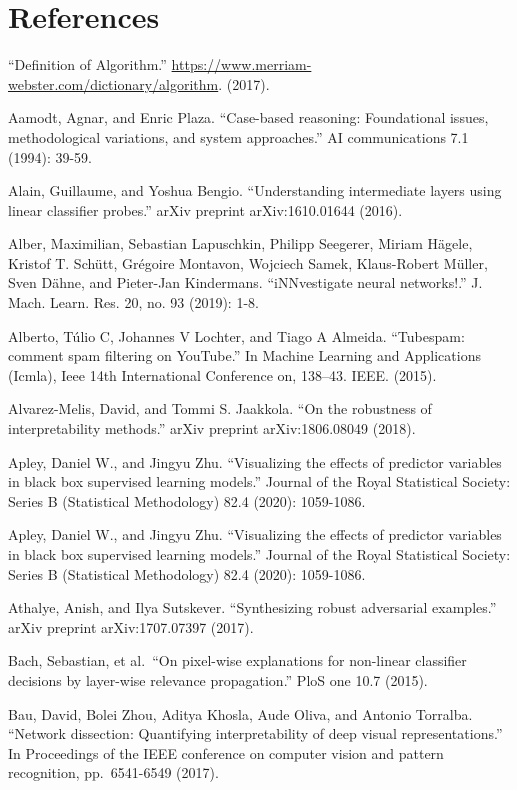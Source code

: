 \documentclass[
  11pt,
]{scrbook}
\begin{document}
\hypertarget{references}{%
\chapter*{References}\label{references}}


``Definition of Algorithm.'' \url{https://www.merriam-webster.com/dictionary/algorithm}. (2017).

Aamodt, Agnar, and Enric Plaza. ``Case-based reasoning: Foundational issues, methodological variations, and system approaches.'' AI communications 7.1 (1994): 39-59.

Alain, Guillaume, and Yoshua Bengio. ``Understanding intermediate layers using linear classifier probes.'' arXiv preprint arXiv:1610.01644 (2016).

Alber, Maximilian, Sebastian Lapuschkin, Philipp Seegerer, Miriam Hägele, Kristof T. Schütt, Grégoire Montavon, Wojciech Samek, Klaus-Robert Müller, Sven Dähne, and Pieter-Jan Kindermans. ``iNNvestigate neural networks!.'' J. Mach. Learn. Res. 20, no. 93 (2019): 1-8.

Alberto, Túlio C, Johannes V Lochter, and Tiago A Almeida. ``Tubespam: comment spam filtering on YouTube.'' In Machine Learning and Applications (Icmla), Ieee 14th International Conference on, 138--43. IEEE. (2015).

Alvarez-Melis, David, and Tommi S. Jaakkola. ``On the robustness of interpretability methods.'' arXiv preprint arXiv:1806.08049 (2018).

Apley, Daniel W., and Jingyu Zhu. ``Visualizing the effects of predictor variables in black box supervised learning models.'' Journal of the Royal Statistical Society: Series B (Statistical Methodology) 82.4 (2020): 1059-1086.

Apley, Daniel W., and Jingyu Zhu. ``Visualizing the effects of predictor variables in black box supervised learning models.'' Journal of the Royal Statistical Society: Series B (Statistical Methodology) 82.4 (2020): 1059-1086.

Athalye, Anish, and Ilya Sutskever. ``Synthesizing robust adversarial examples.'' arXiv preprint arXiv:1707.07397 (2017).

Bach, Sebastian, et al.~``On pixel-wise explanations for non-linear classifier decisions by layer-wise relevance propagation.'' PloS one 10.7 (2015).

Bau, David, Bolei Zhou, Aditya Khosla, Aude Oliva, and Antonio Torralba. ``Network dissection: Quantifying interpretability of deep visual representations.'' In Proceedings of the IEEE conference on computer vision and pattern recognition, pp.~6541-6549 (2017).
\end{document}
